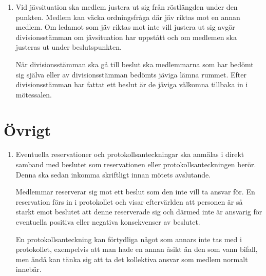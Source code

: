 \documentclass{dvd}
\begin{document}
	\begin{enumerate}[label=\arabic* §, ref=\arabic*]
		\item Vid jävsituation ska medlem justera ut sig från röstlängden under den punkten.
		Medlem kan väcka ordningsfråga där jäv riktas mot en annan medlem.
		Om ledamot som jäv riktas mot inte vill justera ut sig avgör divisionsstämman om jävsituation har uppstått och om medlemen ska justeras ut under beslutspunkten.

		När divisionsstämman ska gå till beslut ska medlemmarna som har bedömt sig själva eller av divisionsstämman bedömts jäviga lämna rummet.
		Efter divisionsstämman har fattat ett beslut är de jäviga välkomna tillbaka in i mötessalen.
	\end{enumerate}

	\section{Övrigt}

	\begin{enumerate}[label=\arabic* §, ref=\arabic*]
		\item Eventuella reservationer och protokollsanteckningar ska anmälas i direkt samband med beslutet som reservationen eller protokollsanteckningen berör.
		Denna ska sedan inkomma skriftligt innan mötets avslutande.

		Medlemmar reserverar sig mot ett beslut som den inte vill ta ansvar för.
		En reservation förs in i protokollet och visar eftervärlden att personen är så starkt emot beslutet att denne reserverade sig och därmed inte är ansvarig för eventuella positiva eller negativa konsekvenser av beslutet.

		En protokollsanteckning kan förtydliga något som annars inte tas med i protokollet, exempelvis att man hade en annan åsikt än den som vann bifall, men ändå kan tänka sig att ta det kollektiva ansvar som medlem normalt innebär.
	\end{enumerate}
\end{document}
